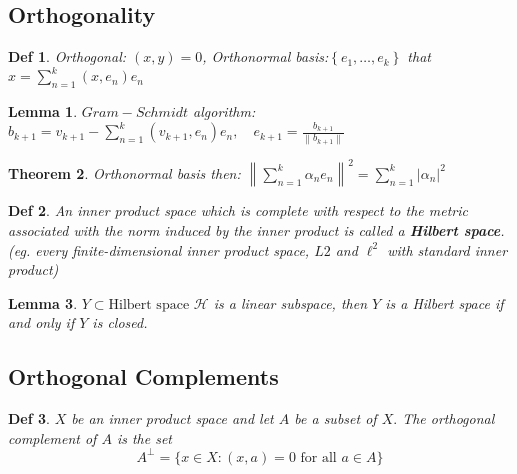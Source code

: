 \documentclass[10pt]{paper}
\newtheorem{theorem}{Theorem}[section]
\newtheorem{definition}{Def}[section]
\newtheorem{lemma}[theorem]{Lemma}
\begin{document}
\subsection{Orthogonality}

\begin{definition}
    Orthogonal: $(x, y)=0$, Orthonormal basis:$\left\{e_{1}, \ldots, e_{k}\right\}$ that $x=\sum_{n=1}^{k}\left(x, e_{n}\right) e_{n}$
\end{definition}

\begin{lemma}
    $Gram-Schmidt$ algorithm: $b_{k+1}=v_{k+1}-\sum_{n=1}^{k}\left(v_{k+1}, e_{n}\right) e_{n}, \quad e_{k+1}=\frac{b_{k+1}}{\left\|b_{k+1}\right\|}$
\end{lemma}

\begin{theorem}
    Orthonormal basis then: $\left\|\sum_{n=1}^{k} \alpha_{n} e_{n}\right\|^{2}=\sum_{n=1}^{k}\left|\alpha_{n}\right|^{2}$
\end{theorem}

\begin{definition}
    An inner product space which is complete with respect to the metric associated with the norm induced by the inner product is called a \textbf{Hilbert space}. (eg. every finite-dimensional inner product space, $L2$ and $\ell^{2}$ with standard inner product)
\end{definition}

\begin{lemma}
    $Y \subset \text{Hilbert space } \mathcal{H}$ is a linear subspace, then $Y$ is a Hilbert space if and only if $Y$ is closed.
\end{lemma}

\subsection{Orthogonal Complements}

\begin{definition}
    $X$ be an inner product space and let $A$ be a subset of $X .$ The orthogonal complement of $A$ is the set
    $$
        A^{\perp}=\{x \in X:(x, a)=0 \text { for all } a \in A\}
    $$
\end{definition}
\end{document}
